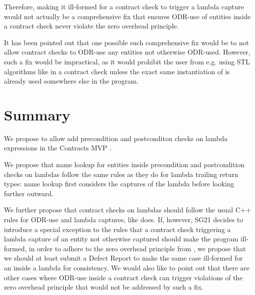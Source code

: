 Therefore, making it ill-formed for a contract check to trigger a lambda capture would not actually be a comprehensive fix that ensures ODR-use of entities inside a contract check never violate the zero overhead principle.

It has been pointed out that one possible such comprehensive fix would be to not allow contract checks to ODR-use any entities not otherwise ODR-used. However, such a fix would be impractical, as it would prohibit the user from e.g. using STL algorithms like  in a contract check unless the exact same instantiation of  is already used somewhere else in the program.

\section{Summary}

We propose to allow add precondition and postconditon checks on lambda expressions in the Contracts MVP \cite{P2900R1}.

We propose that name lookup for entities inside precondition and postcondition checks on lambdas follow the same rules as they do for lambda trailing return types: name lookup first considers the captures of the lambda before looking further outward.

We further propose that contract checks on lambdas should follow the usual C++ rules for ODR-use and lambda captures, like \tcode{[[assume]]} does. If, however, SG21 decides to introduce a special exception to the rules that a contract check triggering a lambda capture of an entity not otherwise captured should make the program ill-formed, in order to adhere to the zero overhead principle from \cite{P2932R1}, we propose that we should at least submit a Defect Report to make the same case ill-formed for an \tcode{[[assume]]} inside a lambda for consistency. We would also like to point out that there are other cases where ODR-use inside a contract check can trigger violations of the zero overhead principle that would not be addressed by such a fix.





\renewcommand{\bibname}{References}




